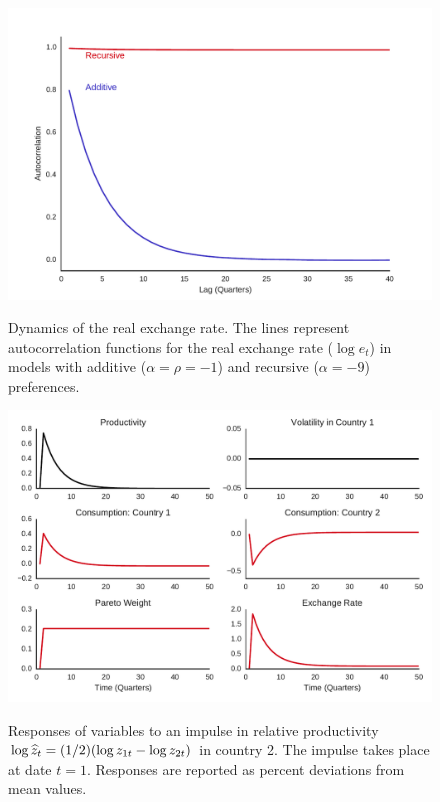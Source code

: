 %
\clearpage
\begin{figure}[htb]
\caption{Dynamics of the real exchange rate.
The lines represent autocorrelation functions for the real exchange rate
($\log e_t$) in models with additive ($\alpha = \rho = -1$)
and recursive ($\alpha = -9$) preferences.}

\includegraphics[width=\textwidth]{images/BCFL/acorr_fx_alpha1_9_one_axis.pdf}
\label{fig:rer-acfs}
\end{figure}

%
\clearpage
\begin{figure}[htb]
\caption{Responses of variables
to an impulse in relative productivity\newline
$\log \widehat{z}_t = (1/2) (\log z_{1t} - \log z_{2t}) $ in country 2.
The impulse takes place at date $t=1$.
Responses are reported as percent deviations from mean values.
}

\bigskip
\includegraphics[width=\textwidth]{images/BCFL/irf_wrt_zhat_alpha9.pdf}
\label{fig:irf-zhat}
\end{figure}

